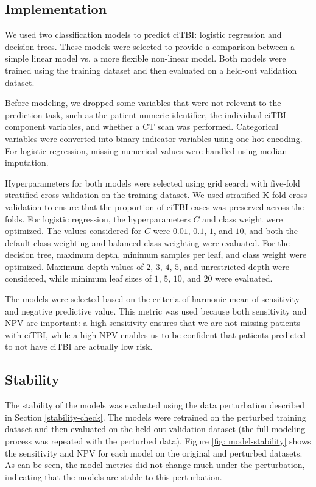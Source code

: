 \documentclass[10pt,letterpaper]{article}
\begin{document}
\subsection{Implementation}

We used two classification models to predict ciTBI: logistic regression and decision trees. These models were selected to provide
a comparison between a simple linear model vs. a more flexible non-linear model. Both models were trained using the training dataset
and then evaluated on a held-out validation dataset.

Before modeling, we dropped some variables that were not relevant to the prediction task, such as the patient numeric identifier, the individual ciTBI component variables,
and whether a CT scan was performed. Categorical variables were converted into binary indicator variables using one-hot encoding.
For logistic regression, missing numerical values were handled using median imputation.

Hyperparameters for both models were selected using grid search with five-fold stratified cross-validation
on the training dataset. We used stratified K-fold cross-validation to ensure that the proportion of ciTBI cases
was preserved across the folds. For logistic regression, the hyperparameters $C$ and class weight were optimized. The values considered for $C$ were $0.01$, $0.1$, $1$, and $10$,
and both the default class weighting and balanced class weighting were evaluated. For the decision tree, maximum depth, minimum samples per leaf, and class weight were optimized.
Maximum depth values of $2$, $3$, $4$, $5$, and unrestricted depth were considered, while minimum leaf sizes of $1$, $5$, $10$, and $20$ were evaluated.

The models were selected based on the criteria of harmonic mean of sensitivity and negative predictive value. This metric
was used because both sensitivity and NPV are important: a high sensitivity ensures that we are not missing patients with ciTBI, while a high NPV
enables us to be confident that patients predicted to not have ciTBI are actually low risk.

\subsection{Stability}

The stability of the models was evaluated using the data perturbation described in Section \ref{stability-check}.
The models were retrained on the perturbed training dataset and then evaluated on the held-out validation dataset (the full modeling process
was repeated with the perturbed data). Figure \ref{fig: model-stability} shows the sensitivity and NPV for each model on the original and perturbed datasets.
As can be seen, the model metrics did not change much under the perturbation, indicating that the models are stable to this perturbation.
\end{document}

